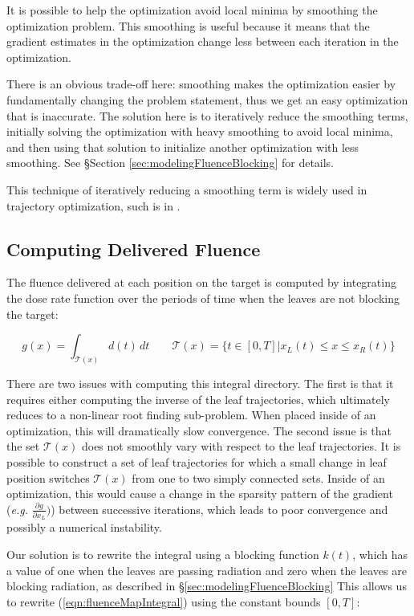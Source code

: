 It is possible to help the optimization avoid local minima by smoothing the optimization problem.
This smoothing is useful because it means that the gradient estimates in the optimization change less
between each iteration in the optimization.

There is an obvious trade-off here: smoothing makes the optimization easier by fundamentally changing the problem statement,
thus we get an easy optimization that is inaccurate.
The solution here is to iteratively reduce the smoothing terms,
initially solving the optimization with heavy smoothing to avoid local minima,
and then using that solution to initialize another optimization with less smoothing.
See \S Section \ref{sec:modelingFluenceBlocking} for details.

This technique of iteratively reducing a smoothing term is widely used in trajectory optimization,
such is in \cite{Srinivasan2006}.


\subsection{Computing Delivered Fluence}

The fluence delivered at each position on the target is computed by integrating the
dose rate function over the periods of time when the leaves are not blocking the target:

\begin{equation}
  g(x) = \int_{\mathcal{T}(x)} \! d(t) \,dt
  \quad \quad
  \mathcal{T}(x) = \{t\in[0,T] | x_L(t) \leq x \leq x_R(t)\}
  \label{eqn:fluenceMapIntegral}
\end{equation}

There are two issues with computing this integral directory.
The first is that it requires either computing the inverse of the leaf trajectories,
which ultimately reduces to a non-linear root finding sub-problem.
When placed inside of an optimization, this will dramatically slow convergence.
The second issue is that the set $\mathcal{T}(x)$ does not smoothly vary with respect to the leaf trajectories.
It is possible to construct a set of leaf trajectories for which a small change in leaf position
switches $\mathcal{T}(x)$ from one to two simply connected sets.
Inside of an optimization, this would cause a change in the sparsity pattern of the gradient
(\textit{e.g.} $\tfrac{\partial g}{\partial x_L})$)
between successive iterations,
which leads to poor convergence and possibly a numerical instability.

Our solution is to rewrite the integral using a blocking function $k(t)$,
which has a value of one when the leaves are passing radiation and
zero when the leaves are blocking radiation, as described in \S\ref{sec:modelingFluenceBlocking}
This allows us to rewrite (\ref{eqn:fluenceMapIntegral}) using the constant bounds $[0, T]$:

